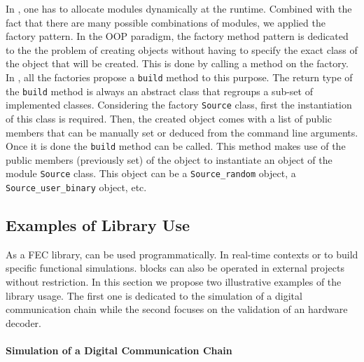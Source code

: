 In \AFFECT, one has to allocate modules dynamically at the runtime. Combined
with the fact that there are many possible combinations of modules, we applied
the factory pattern. In the OOP paradigm, the factory method pattern is
dedicated to the the problem of creating objects without having to specify the
exact class of the object that will be created. This is done by calling a method
on the factory. In \AFFECT, all the factories propose a \verb|build| method to
this purpose. The return type of the \verb|build| method is always an abstract
class that regroups a sub-set of implemented classes. Considering the factory
\verb|Source| class, first the instantiation of this class is required. Then,
the created object comes with a list of public members that can be manually set
or deduced from the command line arguments. Once it is done the \verb|build|
method can be called. This method makes use of the public members (previously
set) of the object to instantiate an object of the module \verb|Source| class.
This object can be a \verb|Source_random| object, a \verb|Source_user_binary|
object, etc.

\subsection{Examples of Library Use}
\label{sec:aff3ct_library_example}

As a FEC library, \AFFECT can be used programmatically. In real-time contexts or
to build specific functional simulations. \AFFECT blocks can also be operated in
external projects without restriction. In this section we propose two
illustrative examples of the \AFFECT library usage. The first one is dedicated
to the simulation of a digital communication chain while the second focuses on
the validation of an hardware decoder.

\paragraph{Simulation of a Digital Communication Chain}

